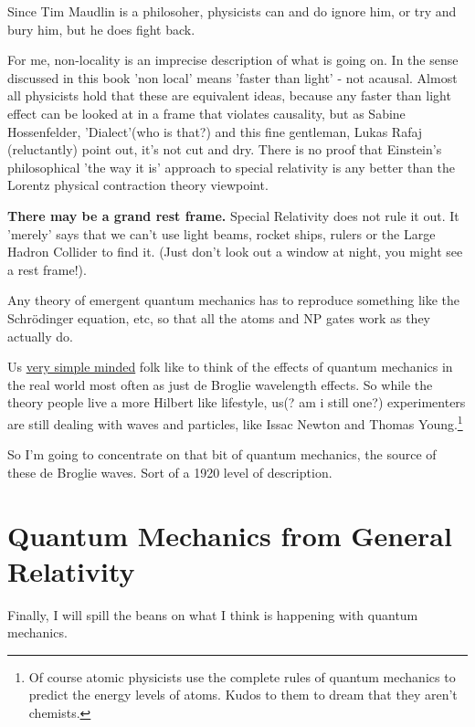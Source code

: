 \documentclass[../rzero]{subfiles}
\begin{document}
Since Tim Maudlin is a philosoher, physicists can and do ignore him, or try and bury him\cite{Werner2014}, but he does fight back\cite{WMaudlin2014}. 

For me, non-locality is an imprecise description of what is going on. In the sense discussed in this book 'non local' means 'faster than light' - not acausal. Almost all physicists hold that these are equivalent ideas, because any faster than light effect can be looked at in a frame that violates causality, but as Sabine Hossenfelder\cite{sabinehossenfelderThinkFasterLight2023}, 'Dialect'(who is that?)\cite{dialectWhatTimeDilation2023} and this fine gentleman, Lukas Rafaj (reluctantly)\cite{physics-problemsandsolutionsOneWaySpeed2023} point out, it's not cut and dry. There is no proof that Einstein's philosophical 'the way it is' approach to special relativity is any better than the Lorentz physical contraction theory viewpoint. 

\textbf{There may be a grand rest frame.} Special Relativity does not rule it out. It 'merely' says that we can't use light beams, rocket ships, rulers or the Large Hadron Collider to find it. (Just don't look out a window at night, you might see a rest frame!).

Any theory of emergent quantum mechanics has to reproduce something like the Schrödinger equation, etc, so that all the atoms and NP gates work as they actually do. 


Us \href{https://youtu.be/p5nWKkyzh_Y?si=eSFOG0lw4fJo7tO2&t=1153}{very simple minded} folk\cite{instituteforadvancedstudySpacetimeQuantumMechanics2021} like to think of the effects of quantum mechanics in the real world most often as just de Broglie wavelength effects. So while the theory people live a more Hilbert like lifestyle, us(? am i still one?) experimenters are still dealing with waves and particles, like Issac Newton and Thomas Young.\footnote{Of course atomic physicists use the complete rules of quantum mechanics to predict the energy levels of atoms. Kudos to them to dream that they aren't chemists.} 

So I'm going to concentrate on that bit of quantum mechanics, the source of these de Broglie waves. Sort of a 1920 level of description.

\section{Quantum Mechanics from General Relativity}
Finally, I will spill the beans on what I think is happening with quantum mechanics. 
\end{document}
